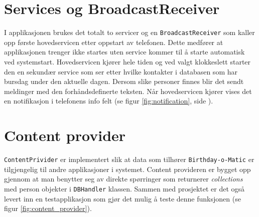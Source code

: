 \section{Services og BroadcastReceiver}
I applikasjonen brukes det totalt to servicer og en \texttt{BroadcastReceiver} som kaller opp første hovedservicen etter oppstart av telefonen. Dette medfører at applikasjonen trenger ikke startes uten service kommer til å starte automatisk ved systemstart. Hovedservicen kjører hele tiden og ved valgt klokkeslett starter den en sekundær service som ser etter hvilke kontakter i databasen som har bursdag under den aktuelle dagen. Dersom slike personer finnes blir det sendt meldinger med den forhåndsdefinerte teksten. 
Når hovedservicen kjører vises det en notifikasjon i telefonens info felt (se figur \ref{fig:notification}, side \pageref{fig:notification}).

\section{Content provider}
\texttt{ContentPrivider} er implementert slik at data som tilhører \texttt{Birthday-o-Matic} er tilgjengelig til andre applikasjoner i systemet. Content provideren er bygget opp gjennom at man benytter seg av direkte spørringer som returnerer \textit{collections} med person objekter i \texttt{DBHandler} klassen. Sammen med prosjektet er det også levert inn en testapplikasjon som gjør det mulig å teste denne funksjonen (se figur \ref{fig:content_provider}).

